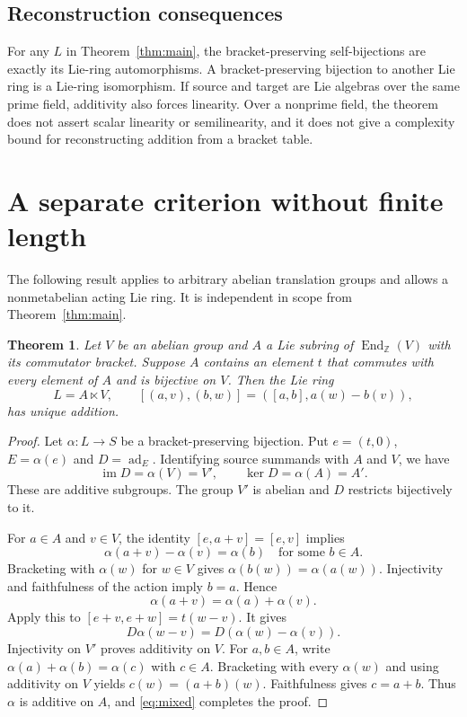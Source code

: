 \documentclass[11pt]{article}
\newtheorem{theorem}{Theorem}
\theoremstyle{definition}
\DeclareMathOperator{\ad}{ad}
\DeclareMathOperator{\im}{im}
\DeclareMathOperator{\End}{End}
\begin{document}
\subsection{Reconstruction consequences}
For any $L$ in Theorem~\ref{thm:main}, the bracket-preserving self-bijections are exactly its Lie-ring automorphisms. A bracket-preserving bijection to another Lie ring is a Lie-ring isomorphism. If source and target are Lie algebras over the same prime field, additivity also forces linearity. Over a nonprime field, the theorem does not assert scalar linearity or semilinearity, and it does not give a complexity bound for reconstructing addition from a bracket table.

\section{A separate criterion without finite length}
The following result applies to arbitrary abelian translation groups and allows a nonmetabelian acting Lie ring. It is independent in scope from Theorem~\ref{thm:main}.

\begin{theorem}\label{thm:affine}
Let $V$ be an abelian group and $A$ a Lie subring of $\End_{\mathbb Z}(V)$ with its commutator bracket. Suppose $A$ contains an element $t$ that commutes with every element of $A$ and is bijective on $V$. Then the Lie ring
\[
 L=A\ltimes V,\qquad
 [(a,v),(b,w)]=([a,b],a(w)-b(v)),
\]
has unique addition.
\end{theorem}
\begin{proof}
Let $\alpha:L\to S$ be a bracket-preserving bijection. Put $e=(t,0)$, $E=\alpha(e)$ and $D=\ad_E$. Identifying source summands with $A$ and $V$, we have
\[
 \im D=\alpha(V)=V',\qquad \ker D=\alpha(A)=A'.
\]
These are additive subgroups. The group $V'$ is abelian and $D$ restricts bijectively to it.

For $a\in A$ and $v\in V$, the identity $[e,a+v]=[e,v]$ implies
\[
 \alpha(a+v)-\alpha(v)=\alpha(b)\quad\text{for some }b\in A.
\]
Bracketing with $\alpha(w)$ for $w\in V$ gives $\alpha(b(w))=\alpha(a(w))$. Injectivity and faithfulness of the action imply $b=a$. Hence
\begin{equation}\label{eq:mixed}
 \alpha(a+v)=\alpha(a)+\alpha(v).
\end{equation}
Apply this to $[e+v,e+w]=t(w-v)$. It gives
\[
 D\alpha(w-v)=D(\alpha(w)-\alpha(v)).
\]
Injectivity on $V'$ proves additivity on $V$. For $a,b\in A$, write $\alpha(a)+\alpha(b)=\alpha(c)$ with $c\in A$. Bracketing with every $\alpha(w)$ and using additivity on $V$ yields $c(w)=(a+b)(w)$. Faithfulness gives $c=a+b$. Thus $\alpha$ is additive on $A$, and \eqref{eq:mixed} completes the proof.
\end{proof}
\end{document}
